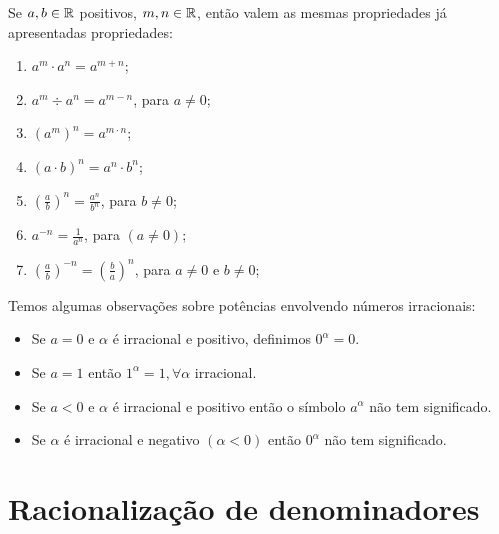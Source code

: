 

  Se $a, b \in \mathbb{R}$ positivos, $m, n \in \mathbb{R}$, então valem as mesmas propriedades já apresentadas propriedades:
 \begin{enumerate}[P1)]
 \item $a^m \cdot a^n= a^{m + n}$;
 \item $a^m \div a^n= a^{m - n}$, para $a \neq 0$;
 \item $(a^m)^n= a^{m \cdot n}$;
 \item $(a \cdot b)^n= a^n \cdot b^n$;
 \item $\left(\frac{a}{b}\right)^n= \frac{a^n}{b^n}$, para $b \neq 0$;
 \item $a^{-n}= \frac{1}{a^n}$, para $(a \neq 0)$;
 \item $\left(\frac{a}{b} \right)^{-n}= \left(\frac{b}{a} \right)^{n}$, para $a \neq 0$ e $b \neq 0$;
 \end{enumerate}

Temos algumas observações sobre potências envolvendo números irracionais:
 \begin{obs}
\begin{itemize}
\item Se $a=0$ e $\alpha$ é irracional e positivo, definimos $0^{\alpha}=0$.
\item Se $a=1$ então $1^{\alpha}= 1, \forall \alpha$ irracional.
\item Se $a < 0$ e $\alpha$ é irracional e positivo então o símbolo $a^{\alpha}$ não tem significado.
\item Se $\alpha$ é irracional e negativo $(\alpha < 0)$ então $0^{\alpha}$ não tem significado.
\end{itemize}
\end{obs}

\section{Racionalização de denominadores}

